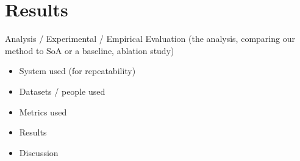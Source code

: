\section{Results}
Analysis / Experimental / Empirical Evaluation (the analysis, comparing our method to SoA or a baseline, ablation study)
\begin{itemize}
    \item System used (for repeatability)
    \item Datasets / people used
    \item Metrics used
    \item Results
    \item Discussion
\end{itemize}



